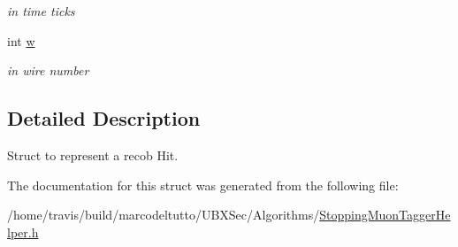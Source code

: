 \begin{DoxyCompactItemize}
\begin{DoxyCompactList}\small\item\em in time ticks \end{DoxyCompactList}\item 
\hypertarget{structubana_1_1SimpleHit_ad9855eb823ac4594af701000035779b9}{int \hyperlink{structubana_1_1SimpleHit_ad9855eb823ac4594af701000035779b9}{w}}\label{structubana_1_1SimpleHit_ad9855eb823ac4594af701000035779b9}

\begin{DoxyCompactList}\small\item\em in wire number \end{DoxyCompactList}\end{DoxyCompactItemize}


\subsection{Detailed Description}
Struct to represent a recob Hit. 

The documentation for this struct was generated from the following file\-:\begin{DoxyCompactItemize}
\item 
/home/travis/build/marcodeltutto/\-U\-B\-X\-Sec/\-Algorithms/\hyperlink{StoppingMuonTaggerHelper_8h}{Stopping\-Muon\-Tagger\-Helper.\-h}\end{DoxyCompactItemize}
